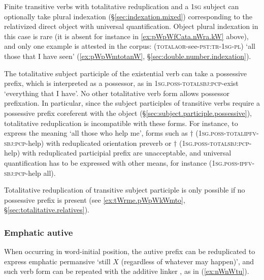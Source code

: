 Finite transitive verbs with totalitative reduplication and a \textsc{1sg} subject can optionally take plural indexation (§\ref{sec:indexation.mixed}) corresponding to the relativized direct object with universal quantification. Object plural indexation in this case is rare (it is absent for instance in \ref{ex:pWpWfCata.nWra.kW} above), and only one example is attested in the corpus:  (\textsc{total}\redp{}\textsc{aor}-see-\textsc{pst}:\textsc{tr}-\textsc{1sg}-\textsc{pl}) `all those that I have seen' (\ref{ex:pWpWmtotanW}, §\ref{sec:double.number.indexation}).


The totalitative subject participle of the existential verb  can take a possessive prefix, which is interpreted as a possessor, as in  \textsc{1sg}.\textsc{poss}-\textsc{total}\redp{}\textsc{sbj}:\textsc{pcp}-exist `everything that I have'. No other totalitative verb form allows possessor prefixation. In particular, since the subject participles of transitive verbs require a possessive prefix coreferent with the object (§\ref{sec:subject.participle.possessive}), totalitative reduplication is incompatible with these forms. For instance, to express the meaning `all those who help me', forms such as $\dagger$ (\textsc{1sg}.\textsc{poss}-\textsc{total}\redp{}\textsc{ipfv}-\textsc{sbj}:\textsc{pcp}-help) with reduplicated orientation preverb or $\dagger$ (\textsc{1sg}.\textsc{poss}-\textsc{total}\redp{}\textsc{sbj}:\textsc{pcp}-help) with reduplicated participial prefix are unacceptable, and universal quantification has to be expressed with other means, for instance  (\textsc{1sg}.\textsc{poss}-\textsc{ipfv}-\textsc{sbj}:\textsc{pcp}-help all).

Totalitative reduplication of transitive subject participle is only possible if no possessive prefix is present (see \ref{ex:tWrme.pWpWkWmto}, §\ref{sec:totalitative.relatives}).

 

\subsubsection{Emphatic autive}  \label{sec:emphatic.autive}
When occurring in word-initial position, the  autive prefix  can be reduplicated to express emphatic permansive `still $X$ (regardless of whatever may happen)', and such verb form can be repeated with the additive linker , as in (\ref{ex:nWnWtu}).

